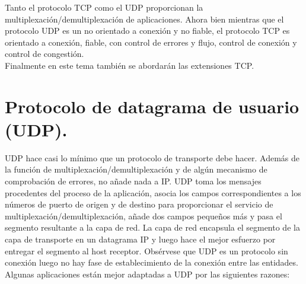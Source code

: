 \documentclass[a4paper,11pt]{article}
\begin{document}
Tanto el protocolo TCP como el UDP proporcionan la multiplexación/demultiplexación de aplicaciones. Ahora bien mientras que el protocolo UDP es un no orientado a conexión y no fiable, el protocolo TCP es orientado a conexión, fiable, con control de errores y flujo, control de conexión y control de congestión. \\

Finalmente en este tema también se abordarán las extensiones TCP.

\section{Protocolo de datagrama de usuario (UDP).}
UDP hace casi lo mínimo que un protocolo de transporte debe hacer. Además de la función de multiplexación/demultiplexación y de algún mecanismo de comprobación de errores, no añade nada a IP. UDP toma los mensajes procedentes del proceso de la aplicación, asocia los campos correspondientes a los números de puerto de origen y de destino para proporcionar el servicio de multiplexación/demultiplexación, añade dos campos pequeños más y pasa el segmento resultante a la capa de red. La capa de red encapsula el segmento de la capa de transporte en un datagrama IP y luego hace el mejor esfuerzo por entregar el segmento al host receptor. Obsérvese que UDP es un protocolo sin conexión luego no hay fase de establecimiento de la conexión entre las entidades. \\

Algunas aplicaciones están mejor adaptadas a UDP por las siguientes razones:
\end{document}
